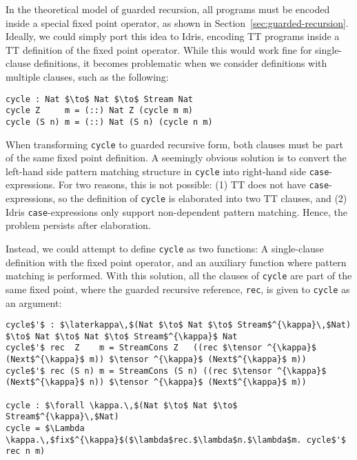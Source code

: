 In the theoretical model of guarded recursion, all programs must be encoded
inside a special fixed point operator, as shown in
Section~\ref{sec:guarded-recursion}. Ideally, we could simply port this idea to
Idris, encoding TT programs inside a TT definition of the fixed point
operator. While this would work fine for single-clause definitions, it becomes
problematic when we consider definitions with multiple clauses, such as the
following: 

\begin{lstlisting}[mathescape,title=\ttBlock]
cycle : Nat $\to$ Nat $\to$ Stream Nat
cycle Z     m = (::) Nat Z (cycle m m)
cycle (S n) m = (::) Nat (S n) (cycle n m)
\end{lstlisting}

When transforming \texttt{cycle} to guarded recursive form, both clauses must be
part of the same fixed point definition. A seemingly obvious solution is to
convert the left-hand side pattern matching structure in \texttt{cycle} into
right-hand side \texttt{case}-expressions. For two reasons, this is not
possible: (1) TT does not have \texttt{case}-expressions, so the definition of
\texttt{cycle} is elaborated into two TT clauses, and (2) Idris
\texttt{case}-expressions only support non-dependent pattern matching. Hence,
the problem persists after elaboration.

Instead, we could attempt to define \texttt{cycle} as two functions: A
single-clause definition with the fixed point operator, and an auxiliary
function where pattern matching is performed. With this solution, all the clauses of
\texttt{cycle} are part of the same fixed point, where the guarded recursive reference,
\texttt{rec}, is given to \texttt{cycle} as an argument:

\begin{lstlisting}[mathescape, title=\ttBlock]
cycle$'$ : $\laterkappa\,$(Nat $\to$ Nat $\to$ Stream$^{\kappa}\,$Nat) $\to$ Nat $\to$ Nat $\to$ Stream$^{\kappa}$ Nat
cycle$'$ rec  Z    m = StreamCons Z   ((rec $\tensor ^{\kappa}$ (Next$^{\kappa}$ m)) $\tensor ^{\kappa}$ (Next$^{\kappa}$ m))
cycle$'$ rec (S n) m = StreamCons (S n) ((rec $\tensor ^{\kappa}$ (Next$^{\kappa}$ n)) $\tensor ^{\kappa}$ (Next$^{\kappa}$ m))

cycle : $\forall \kappa.\,$(Nat $\to$ Nat $\to$ Stream$^{\kappa}\,$Nat)
cycle = $\Lambda \kappa.\,$fix$^{\kappa}$($\lambda$rec.$\lambda$n.$\lambda$m. cycle$'$ rec n m)
\end{lstlisting}


